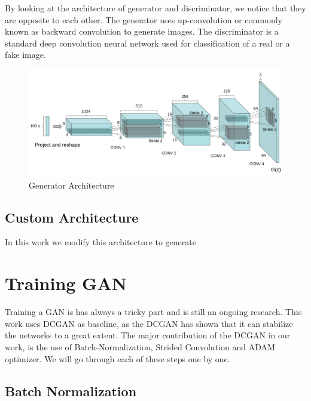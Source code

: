 By looking at the architecture of generator and discriminator, we notice that they are  opposite to each other. The generator uses up-convolution or commonly known as backward convolution to generate images. %
The discriminator is a standard deep convolution neural network used for classification of a real or a fake image.
\begin{figure}
  \centering
    \includegraphics[scale=.7, angle=0]{Files/Generator-Architecture.png}
    \caption[Generator Architecture]{Generator Architecture\cite{DCGAN}}
    \label{fig:DCGAN}
\end{figure}

\subsection{Custom Architecture}

In this work we modify this architecture to generate  

\section{Training GAN}

Training a GAN is has always a tricky part and is still an ongoing research. This work uses DCGAN\cite{DCGAN} as baseline, as the DCGAN has shown that it can stabilize the networks to a great extent. The major contribution of the DCGAN in our work, is the use of Batch-Normalization, Strided Convolution and ADAM optimizer. We will go through each of these steps one by one.
\subsection{Batch Normalization}

